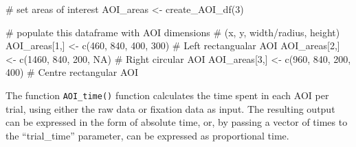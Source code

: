 \documentclass[
  man,
  floatsintext,
  longtable,
  nolmodern,
  notxfonts,
  notimes,
  colorlinks=true,linkcolor=blue,citecolor=blue,urlcolor=blue]{apa7}
\newenvironment{Shaded}{\begin{snugshade}}{\end{snugshade}}
\newcommand{\AttributeTok}[1]{\textcolor[rgb]{0.40,0.45,0.13}{#1}}
\newcommand{\CommentTok}[1]{\textcolor[rgb]{0.37,0.37,0.37}{#1}}
\newcommand{\ConstantTok}[1]{\textcolor[rgb]{0.56,0.35,0.01}{#1}}
\newcommand{\DecValTok}[1]{\textcolor[rgb]{0.68,0.00,0.00}{#1}}
\newcommand{\FunctionTok}[1]{\textcolor[rgb]{0.28,0.35,0.67}{#1}}
\newcommand{\NormalTok}[1]{\textcolor[rgb]{0.00,0.23,0.31}{#1}}
\newcommand{\OtherTok}[1]{\textcolor[rgb]{0.00,0.23,0.31}{#1}}
\newcommand{\SpecialCharTok}[1]{\textcolor[rgb]{0.37,0.37,0.37}{#1}}
\newcommand{\StringTok}[1]{\textcolor[rgb]{0.13,0.47,0.30}{#1}}
\begin{document}
\begin{Shaded}
\begin{Highlighting}[]
\CommentTok{\# set areas of interest}
\NormalTok{AOI\_areas }\OtherTok{\textless{}{-}} \FunctionTok{create\_AOI\_df}\NormalTok{(}\DecValTok{3}\NormalTok{)}

\CommentTok{\# populate this dataframe with AOI dimensions }
\CommentTok{\# (x, y, width/radius, height)}
\NormalTok{AOI\_areas[}\DecValTok{1}\NormalTok{,] }\OtherTok{\textless{}{-}} \FunctionTok{c}\NormalTok{(}\DecValTok{460}\NormalTok{, }\DecValTok{840}\NormalTok{, }\DecValTok{400}\NormalTok{, }\DecValTok{300}\NormalTok{) }\CommentTok{\# Left rectangualar AOI}
\NormalTok{AOI\_areas[}\DecValTok{2}\NormalTok{,] }\OtherTok{\textless{}{-}} \FunctionTok{c}\NormalTok{(}\DecValTok{1460}\NormalTok{, }\DecValTok{840}\NormalTok{, }\DecValTok{200}\NormalTok{, }\ConstantTok{NA}\NormalTok{) }\CommentTok{\# Right circular AOI}
\NormalTok{AOI\_areas[}\DecValTok{3}\NormalTok{,] }\OtherTok{\textless{}{-}} \FunctionTok{c}\NormalTok{(}\DecValTok{960}\NormalTok{, }\DecValTok{840}\NormalTok{, }\DecValTok{200}\NormalTok{, }\DecValTok{400}\NormalTok{) }\CommentTok{\# Centre rectangular AOI}
\end{Highlighting}
\end{Shaded}

The function \texttt{AOI\_time()} function calculates the time spent in
each AOI per trial, using either the raw data or fixation data as input.
The resulting output can be expressed in the form of absolute time, or,
by passing a vector of times to the ``trial\_time'' parameter, can be
expressed as proportional time.

\begin{Shaded}
\end{Shaded}
\end{document}
